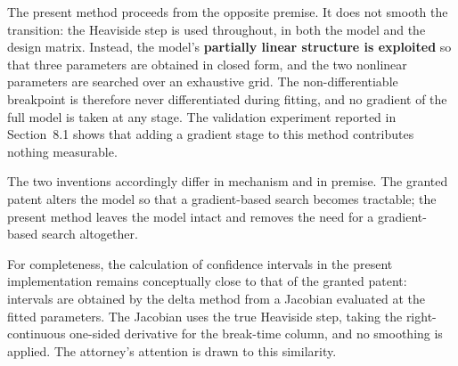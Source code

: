 \documentclass[11pt,a4paper]{article}
\begin{document}
The present method proceeds from the opposite premise. It does not smooth
the transition: the Heaviside step is used throughout, in both the model
and the design matrix. Instead, the model's \textbf{partially linear structure is
exploited} so that three parameters are obtained in closed form, and the
two nonlinear parameters are searched over an exhaustive grid. The
non-differentiable breakpoint is therefore never differentiated during
fitting, and no gradient of the full model is taken at any stage. The
validation experiment reported in Section~8.1 shows that adding a
gradient stage to this method contributes nothing measurable.

The two inventions accordingly differ in mechanism and in premise. The
granted patent alters the model so that a gradient-based search becomes
tractable; the present method leaves the model intact and removes the need
for a gradient-based search altogether.

For completeness, the calculation of confidence intervals in the present
implementation remains conceptually close to that of the granted patent:
intervals are obtained by the delta method from a Jacobian evaluated at
the fitted parameters. The Jacobian uses the true Heaviside step, taking
the right-continuous one-sided derivative for the break-time column, and
no smoothing is applied. The attorney's attention is drawn to this
similarity.
\end{document}
